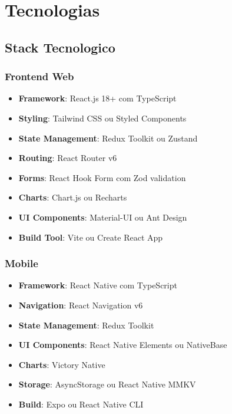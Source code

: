 \section{Tecnologias}

\subsection{Stack Tecnologico}

\subsubsection{Frontend Web}
\begin{itemize}
    \item \textbf{Framework}: React.js 18+ com TypeScript
    \item \textbf{Styling}: Tailwind CSS ou Styled Components
    \item \textbf{State Management}: Redux Toolkit ou Zustand
    \item \textbf{Routing}: React Router v6
    \item \textbf{Forms}: React Hook Form com Zod validation
    \item \textbf{Charts}: Chart.js ou Recharts
    \item \textbf{UI Components}: Material-UI ou Ant Design
    \item \textbf{Build Tool}: Vite ou Create React App
\end{itemize}

\subsubsection{Mobile}
\begin{itemize}
    \item \textbf{Framework}: React Native com TypeScript
    \item \textbf{Navigation}: React Navigation v6
    \item \textbf{State Management}: Redux Toolkit
    \item \textbf{UI Components}: React Native Elements ou NativeBase
    \item \textbf{Charts}: Victory Native
    \item \textbf{Storage}: AsyncStorage ou React Native MMKV
    \item \textbf{Build}: Expo ou React Native CLI
\end{itemize}

